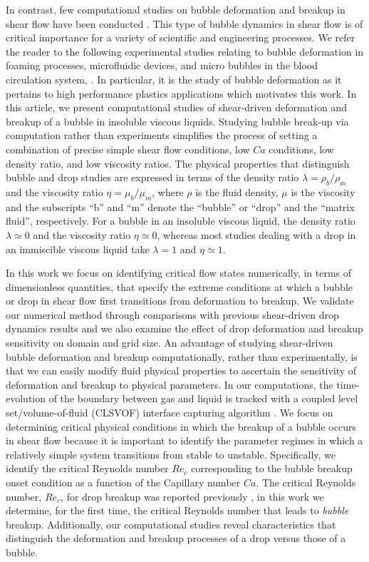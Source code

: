 \documentclass[%
 reprint,
 showkeys,
 amsmath,amssymb,
 aps,
 prfluids,
 onecolumn
]{revtex4-2}
\begin{document}
In contrast, few computational studies on bubble deformation and breakup in
shear flow have been conducted \cite{WanShiZha15}.  This type of bubble
dynamics in shear flow is of critical importance for a variety of
scientific and engineering processes. We refer the reader to the 
following experimental studies relating to bubble deformation in foaming
processes, microfluidic devices, and micro bubbles in the blood 
circulation system,
\cite{CHU2019108,muller2008single,bento2018deformation,drenckhan2015science}.
In particular, it is the study of bubble deformation as it pertains
to high performance plastics applications which motivates this work.  
In this article, we present
computational studies of shear-driven deformation and breakup of a bubble in
insoluble viscous liquids.  
Studying bubble break-up via computation rather
than experiments simplifies the process of setting a combination of
precise simple shear flow conditions, low $Ca$ conditions, low density ratio, 
and low viscosity ratios.
The physical properties that distinguish bubble and
drop studies are expressed in terms of the density ratio $\lambda = \rho_b /
\rho_m$ and the viscosity ratio $\eta = \mu_b / \mu_m$, where $\rho$ is the
fluid density, $\mu$ is the viscosity and the subscripts ``b'' and ``m'' denote
the ``bubble'' or ``drop'' and the ``matrix fluid'', respectively.  For a
bubble in an insoluble viscous liquid, the density ratio $\lambda \simeq 0$ and
the viscosity ratio $\eta \simeq 0$, whereas most studies dealing with a drop
in an immiscible viscous liquid take $\lambda =1$ and $\eta \simeq 1$.  

In this work we focus on identifying critical flow states numerically, in terms
of dimensionless quantities, that specify the extreme conditions at which a
bubble or drop in shear flow first transitions from deformation to breakup.
We validate our numerical method through comparisons with previous
shear-driven drop dynamics results and we also examine the effect of drop
deformation and breakup sensitivity on domain and grid size.  An advantage of
studying shear-driven bubble deformation and breakup computationally, rather
than experimentally, is that we can easily modify fluid physical properties to
ascertain the sensitivity of deformation and breakup to physical parameters.
In our computations, the time-evolution of the boundary between gas and liquid
is tracked with a coupled level set/volume-of-fluid (CLSVOF) interface
capturing algorithm \cite{SusPuc00}.  We focus on determining critical physical
conditions in which the breakup of a bubble occurs in shear flow because it is
important to identify the parameter regimes in which a relatively simple system
transitions from stable to unstable.  Specifically, we identify the critical
Reynolds number $Re_{c}$ corresponding to the bubble breakup onset condition as
a function of the Capillary number $Ca$.  The critical Reynolds number, 
$Re_{c}$, for drop
breakup was reported previously \cite{LiRenRen00}, in this work we determine,
for the first time, the critical Reynolds number that leads to \emph{bubble}
breakup.  Additionally, our computational studies reveal characteristics that
distinguish the deformation and breakup processes of a drop versus those of a
bubble.
\end{document}
